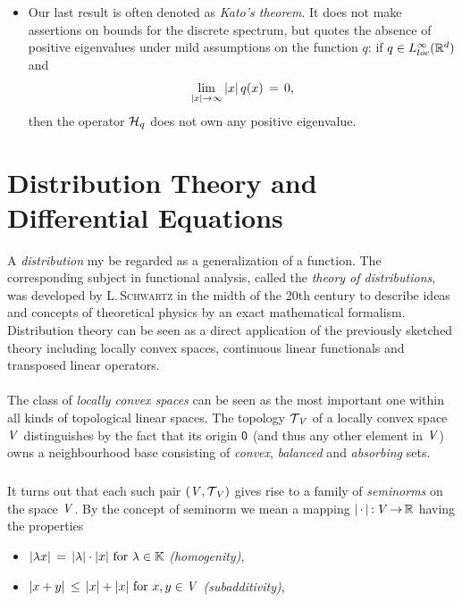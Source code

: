 \documentclass[11pt,twoside]{article}
\begin{document}
\begin{itemize}[leftmargin=9mm]
\begin{itemize}[leftmargin=4mm]
\item[3.]
Our last result is often denoted as \textit{Kato}\textit{'s theorem}.
It does not make assertions on bounds for the discrete spectrum,
but quotes the absence of positive eigen\-values
under mild assumptions on the function $q$:
if $q \in L_{loc}^{\infty}({\mathbb{R}}^d)$ and
\[
\lim_{\abs{x} \to \infty} \, \abs{x} \, q(x) \= 0,
\]
then the operator ${\mathcal{H}}_q$ does not own any positive eigen\-value.
\end{itemize}
\end{itemize}

\section{Distribution Theory and Differential Equations}                       %
A \textit{distribution} my be regarded as a generalization of a function.
The corresponding subject in functional analysis,
called the \textit{theory of distributions},
was developed by \textsc{L.\,Schwartz} in the midth of the 20th century
to describe ideas and concepts of theoretical physics
by an exact mathematical formalism.
Distribution theory can be seen as a direct application
of the previously sketched theory including
locally convex spaces, continuous linear functionals and
transposed linear operators.

\paragraph{} %
The class of \textit{locally convex spaces} can be seen as the most important
one within all kinds of topological linear spaces.
The topology $\mathcal{T}_{\,\mathit{V}}$ of a locally convex space $\mathit{V}$ distinguishes
by the fact
that its origin ${\mathsf{0}}$
(and thus any other element in $\mathit{V}$) owns a neighbourhood base
consisting of \textit{convex}, \textit{balanced} and \textit{absorbing} sets.

\subparagraph{} %
It turns out
that each such pair $(\mathit{V},\mathcal{T}_{\,\mathit{V}})$ gives rise to
a family of \textit{seminorms} on the space $\mathit{V}$.
By the concept of seminorm
we mean a mapping $\abs{\,\cdot\,} \:\vecV \xto \R$ having the properties

\begin{itemize}[leftmargin=55pt,itemsep=2pt]
\item[(SN-1)] \quad
$\abs{\lambda x} \= \abs{\lambda} \cdot \abs{x} \for \lambda \in \F$
\textit{(homogenity)},
\item[(SN-2)] \quad
$\abs{x+y} \, \leq \, \abs{x} + \abs{x} \for x,y \in \vecV$
\textit{(subadditivity)},
\end{itemize}
\end{document}
